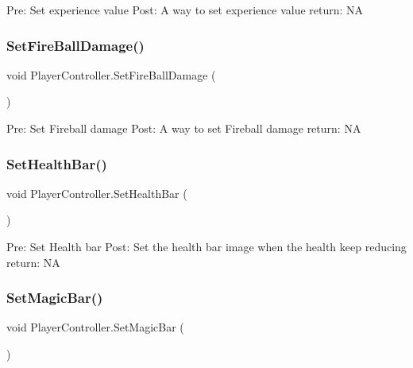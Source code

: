 Pre\+: Set experience value Post\+: A way to set experience value return\+: NA \mbox{\label{class_player_controller_a6b4d0a4ab8c29eb7272c807d608c4f3a}} 
\subsubsection{\texorpdfstring{Set\+Fire\+Ball\+Damage()}{SetFireBallDamage()}}
{\footnotesize\ttfamily void Player\+Controller.\+Set\+Fire\+Ball\+Damage (\begin{DoxyParamCaption}{ }\end{DoxyParamCaption})\hspace{0.3cm}{\ttfamily [private]}}

Pre\+: Set Fireball damage Post\+: A way to set Fireball damage return\+: NA \mbox{\label{class_player_controller_a386e094ad5ecd209ab743e74c7f9acb6}} 
\subsubsection{\texorpdfstring{Set\+Health\+Bar()}{SetHealthBar()}}
{\footnotesize\ttfamily void Player\+Controller.\+Set\+Health\+Bar (\begin{DoxyParamCaption}{ }\end{DoxyParamCaption})\hspace{0.3cm}{\ttfamily [private]}}

Pre\+: Set Health bar Post\+: Set the health bar image when the health keep reducing return\+: NA \mbox{\label{class_player_controller_a17fa240e3211d11288e6c116e0ab6fa3}} 
\subsubsection{\texorpdfstring{Set\+Magic\+Bar()}{SetMagicBar()}}
{\footnotesize\ttfamily void Player\+Controller.\+Set\+Magic\+Bar (\begin{DoxyParamCaption}{ }\end{DoxyParamCaption})\hspace{0.3cm}{\ttfamily [private]}}

